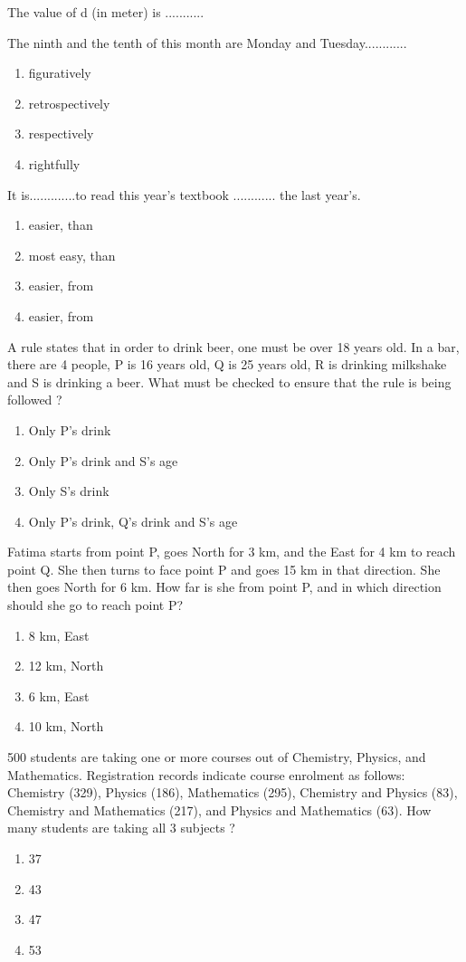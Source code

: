 The value of d (in meter) is ...........

\item The ninth and the tenth of this month are Monday and Tuesday............
\begin{enumerate}
\item figuratively
\item retrospectively
\item respectively
\item rightfully
\end{enumerate}

\item It is.............to read this year's textbook ............ the last year's.
\begin{enumerate}
\item easier, than
\item most easy, than
\item easier, from
\item easier, from
\end{enumerate}

\item A rule states that in order to drink beer, one must be over 18 years old. In a bar, there are 4 people, P is 16 years old, Q is 25 years old, R is drinking milkshake and S is drinking a beer. What must be checked to ensure that the rule is being followed ?
\begin{enumerate}
\item Only P's drink
\item Only P's drink and S's age
\item Only S's drink
\item Only P's drink, Q's drink and S's age
\end{enumerate}

\item Fatima starts from point P, goes North for 3 km, and the East for 4 km to reach point Q. She then turns to face point P and goes 15 km in that direction. She then goes North for 6 km. How far is she from point P, and in which direction should she go to reach point P?
\begin{enumerate}
\item 8 km, East
\item 12 km, North
\item 6 km, East
\item 10 km, North
\end{enumerate}

\item 500 students are taking one or more courses out of Chemistry, Physics, and Mathematics. Registration records indicate course enrolment as follows: Chemistry (329), Physics (186), Mathematics (295), Chemistry and Physics (83), Chemistry and Mathematics (217), and Physics and Mathematics (63). How many students are taking all 3 subjects ?
\begin{enumerate}
\item 37
\item 43
\item 47
\item 53
\end{enumerate}

